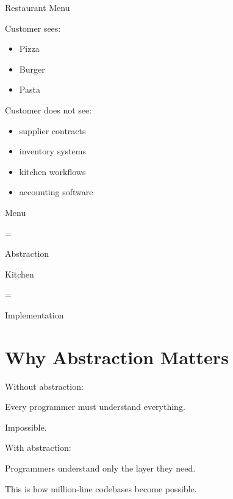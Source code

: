 \documentclass[11pt,a4paper]{book}
\begin{document}
\begin{mentalmodel}

Restaurant Menu

Customer sees:

\begin{itemize}
\item Pizza
\item Burger
\item Pasta
\end{itemize}


Customer does not see:

\begin{itemize}
\item supplier contracts
\item inventory systems
\item kitchen workflows
\item accounting software
\end{itemize}


Menu

=

Abstraction

Kitchen

=

Implementation

\end{mentalmodel}


\section{Why Abstraction Matters}

Without abstraction:

Every programmer must understand everything.

Impossible.


With abstraction:

Programmers understand only the layer they need.


This is how million-line codebases become possible.

\end{document}
